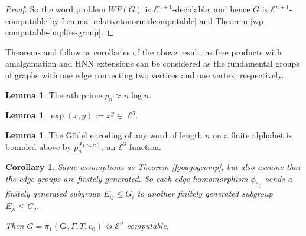 \documentclass[a4paper]{article}
\newcommand{\grz}[1]{$\mathcal{E}^{#1}$}	%
\theoremstyle{plain}
\newtheorem{corollary}[theorem]{Corollary}
\theoremstyle{definition}
\newtheorem{lemma}[theorem]{Lemma}
\begin{document}
\begin{proof}
So the word problem $WP(G)$ is \grz{n+1}-decidable, and hence $G$ is \grz{n+1}-computable by Lemma \ref{relativetonormalcomputable} and Theorem \ref{wp-computable-implies-group}.
\end{proof}

Theorems \cite[4.6]{Cannonito_1973} and \cite[5.3]{Cannonito_1973} follow as corollaries of the above result, as free products with amalgamation and HNN extensions can be considered as the fundamental groups of graphs with one edge connecting two vertices and one vertex, respectively.

\begin{lemma}\label{primedist}
The $n$th prime $p_n \approx n \log n$.
\end{lemma}
\begin{lemma}\label{expine3}
$\exp(x,y) := x^y \in $ \grz{3}.
\end{lemma}
\begin{lemma}\label{godelbound}
The G\"odel encoding of any word of length $n$ on a finite alphabet is bounded above by $p_n^{J(n,n)}$, an \grz{3} function.
\end{lemma}

\begin{corollary}

Same assumptions as Theorem \ref{fgoagogcomp}, but also assume that the edge groups are finitely generated. So each edge homomorphism $\phi_{e_{ij}}$ sends a finitely generated subgroup $E_{ij} \leq G_i$ to another finitely generated subgroup $E_{ji} \leq G_j$.

Then $G = \pi_1(\mathbf{G}, \Gamma, T, v_0)$ is \grz{n}-computable.

\end{corollary}
\end{document}
